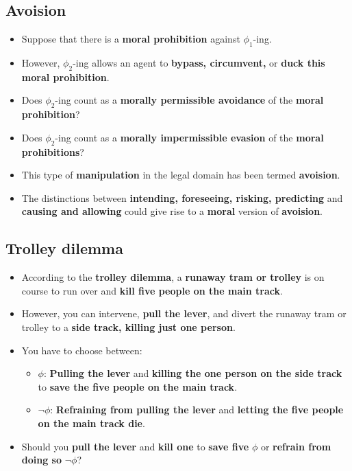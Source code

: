 \documentclass[11pt]{article}
\begin{document}
 \newpage
\subsection{Avoision}
\label{sec:orgc6e1c1b}
\begin{itemize}
\item Suppose that there is a \textbf{moral prohibition} against \(\phi_1\)-ing.
\item However, \(\phi_2\)-ing allows an agent to \textbf{bypass, circumvent,} or \textbf{duck this moral prohibition}.
\item Does \(\phi_2\)-ing count as a \textbf{morally permissible avoidance} of the \textbf{moral prohibition}?
\item Does \(\phi_2\)-ing count as a \textbf{morally impermissible evasion} of the \textbf{moral prohibitions}?
\item This type of \textbf{manipulation} in the legal domain has been termed \textbf{avoision}.
\item The distinctions between \textbf{intending, foreseeing, risking, predicting} and \textbf{causing and allowing} could give rise to a \textbf{moral} version of \textbf{avoision}.
\end{itemize}
\subsection{Trolley dilemma}
\label{sec:org0606477}
\begin{itemize}
\item According to the \textbf{trolley dilemma}, a \textbf{runaway tram or trolley} is on course to run over and \textbf{kill five people on the main track}.
\item However, you can intervene, \textbf{pull the lever}, and divert the runaway tram or trolley to a \textbf{side track, killing just one person}.
\item You have to choose between:
\begin{itemize}
\item \(\phi\): \textbf{Pulling the lever} and \textbf{killing the one person on the side track} to \textbf{save the five people on the main track}.
\item \(\neg \phi\): \textbf{Refraining from pulling the lever} and \textbf{letting the five people on the main track die}.
\end{itemize}
\item Should you \textbf{pull the lever} and \textbf{kill one} to \textbf{save five} \(\phi\) or \textbf{refrain from doing so} \(\neg \phi\)?
\end{itemize}
\end{document}
